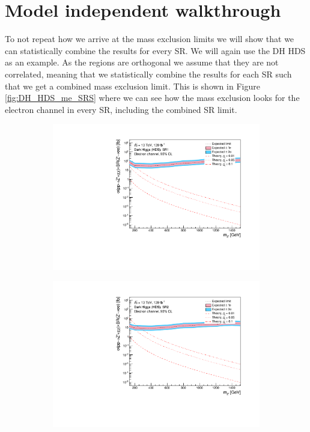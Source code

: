 \documentclass[12pt, a4paper]{book}
\begin{document}
\section{Model independent walkthrough}
To not repeat how we arrive at the mass exclusion limits we will show that we can statistically combine the results for every SR. We will again use the DH HDS as an example. As the regions are orthogonal we assume that they are not correlated, 
meaning that we statistically combine the results for each SR such that we get a combined mass exclusion limit. This is shown in Figure \ref{fig:DH_HDS_me_SRS} where we can see how the mass exclusion looks for
the electron channel in every SR, including the combined SR limit. 
\begin{figure}[!ht]
	\centering
	\begin{subfigure}[b]{0.49\textwidth}
      \centering
      \includegraphics[width=1\textwidth]{Limits/Model_independent/50-100/DH_HDS/mass_exclusion_ee.pdf}
   \end{subfigure}
   \hfill
   \begin{subfigure}[b]{0.49\textwidth}
      \centering
      \includegraphics[width=1\textwidth]{Limits/Model_independent/100-150/DH_HDS/mass_exclusion_ee.pdf}

\end{subfigure}
\end{figure}
\end{document}
